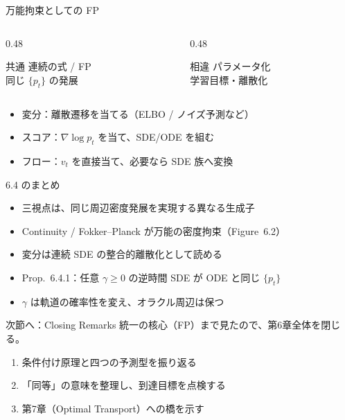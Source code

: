 \asmain
\begin{frame}{万能拘束としての FP}
    \begin{columns}[T,onlytextwidth]
        \begin{column}{0.48\textwidth}
            \begin{block}{共通}
                連続の式 / FP\\
                同じ $\{p_t\}$ の発展
            \end{block}
        \end{column}
        \begin{column}{0.48\textwidth}
            \begin{block}{相違}
                パラメータ化\\
                学習目標・離散化
            \end{block}
        \end{column}
    \end{columns}
    \vfill
    \begin{itemize}
        \item 変分：離散遷移を当てる（ELBO / ノイズ予測など）
        \item スコア：$\nabla\log p_t$ を当て、SDE/ODE を組む
        \item フロー：$v_t$ を直接当て、必要なら SDE 族へ変換
    \end{itemize}
\end{frame}
\asmain
\begin{frame}{6.4 のまとめ}
    \begin{itemize}
        \item 三視点は、同じ周辺密度発展を実現する異なる生成子
        \item Continuity / Fokker--Planck が万能の密度拘束（Figure~6.2）
        \item 変分は連続 SDE の整合的離散化として読める
        \item Prop.~6.4.1：任意 $\gamma\ge 0$ の逆時間 SDE が ODE と同じ $\{p_t\}$
        \item $\gamma$ は軌道の確率性を変え、オラクル周辺は保つ
    \end{itemize}
\end{frame}
\asmain
\begin{frame}{次節へ：Closing Remarks}
    統一の核心（FP）まで見たので、第6章全体を閉じる。
    \begin{enumerate}
        \item 条件付け原理と四つの予測型を振り返る
        \item 「同等」の意味を整理し、到達目標を点検する
        \item 第7章（Optimal Transport）への橋を示す
    \end{enumerate}
\end{frame}
